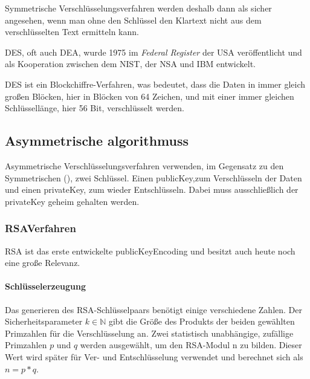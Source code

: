 Symmetrische Verschlüsselungsverfahren werden deshalb dann als sicher angesehen, wenn man ohne den Schlüssel den Klartext nicht aus dem verschlüsselten Text ermitteln kann.\autocite[\pagef~5]{kryptographische-algorithmen}

\ac{DES}, oft auch \ac{DEA}, wurde 1975 im \textit{Federal Register} der USA
veröffentlicht und als Kooperation zwischen dem \ac{NIST}, der \ac{NSA} und \ac{IBM} entwickelt.\autocite[\pagef~232]{nsa-meyer}

\ac{DES} ist ein Blockchiffre-Verfahren, was bedeutet, dass die Daten in immer gleich großen Blöcken, hier in Blöcken von 64 Zeichen, und mit einer immer gleichen Schlüssellänge, hier 56 Bit, verschlüsselt werden.\autocite[\pagef~6]{kryptographische-algorithmen}


\subsection[Asymmetrische Algorithmen]{Asymmetrische \glspl{algorithmus}}\label{subsec:asymmetrische-algorithmen}
Asymmetrische Verschlüsselungsverfahren verwenden, im Gegensatz zu den Symmetrischen (\solol), zwei Schlüssel.
Einen \gls{publicKey},zum Verschlüsseln der Daten und einen \gls{privateKey}, zum wieder Entschlüsseln.
Dabei muss ausschließlich der \gls{privateKey} geheim gehalten werden.


\subsubsection[RSA-Verfahren]{\acs{RSA}\nonbreakdash Verfahren}\label{subsubsec:rsa-verfahren}

\ac{RSA} ist das erste entwickelte \gls{publicKeyEncoding} und besitzt auch heute noch eine große Relevanz.\autocite[\pagef~168]{buchmann-einfuhrung-2016}

\paragraph[Schlüsselerzeugung]{Schlüsselerzeugung}\label{par:schluesselerzeugung}
Das generieren des \ac{RSA}-Schlüsselpaars benötigt einige verschiedene Zahlen.
Der Sicherheitsparameter $k \in \mathbb{N}$ gibt die Größe des Produkts der beiden gewählten Primzahlen für die Verschlüsselung an.
Zwei statistisch unabhängige, zufällige Primzahlen $p$ und $q$ werden ausgewählt, um den \ac{RSA}-Modul n zu bilden.
Dieser Wert wird später für Ver- und Entschlüsselung verwendet und berechnet sich als $n = p*q$.


